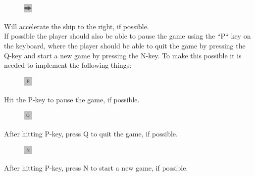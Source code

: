 \documentclass[../master.tex]{subfiles}
\begin{document}
\begin{figure}
	\vspace{-6mm}
	\begin{centering}
		\includegraphics[width=0.04\textwidth]{./Pictures/Pil_right.png}
	\end{centering}
	\vspace{-6mm}
\end{figure}
Will accelerate the ship to the right, if possible.\\

If possible the player should also be able to pause the game using the ``P`` key on the keyboard, where the player should be able to quit the game by pressing the Q-key and start a new game by pressing the N-key. To make this possible it is needed to implement the following things:\\
\begin{figure}
	\vspace{-5.9mm}
	\begin{centering}
		\includegraphics[width=0.04\textwidth]{./Pictures/Pause.png}
	\end{centering}
	\vspace{-6mm}
\end{figure}
Hit the P-key to pause the game, if possible.\\

\begin{figure}
	\vspace{-5.9mm}
	\begin{centering}
		\includegraphics[width=0.04\textwidth]{./Pictures/Quit.png}
	\end{centering}
	\vspace{-6mm}
\end{figure}
After hitting P-key, press Q to quit the game, if possible.\\

\begin{figure}
	\vspace{-6mm}
	\begin{centering}
		\includegraphics[width=0.04\textwidth]{./Pictures/New_Game.png}
	\end{centering}
	\vspace{-6mm}
\end{figure}
After hitting P-key, press N to start a new game, if possible.\\
\end{document}
